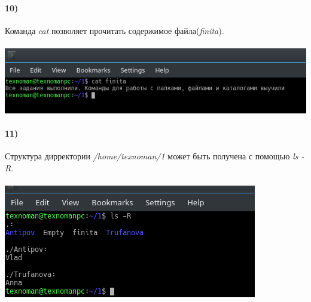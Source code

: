 	\paragraph{10)}
	Команда \textit{cat} позволяет прочитать содержимое файла(\textit{finita}).\\
	\\
	\includegraphics[width=\textwidth]{13.png}
	\\
	
	\paragraph{11)}
	Структура дирректории \textit{/home/texnoman/1} может быть получена с помощью \textit{ls -R}.\\
	\\
	\includegraphics[width=\textwidth]{14.png}